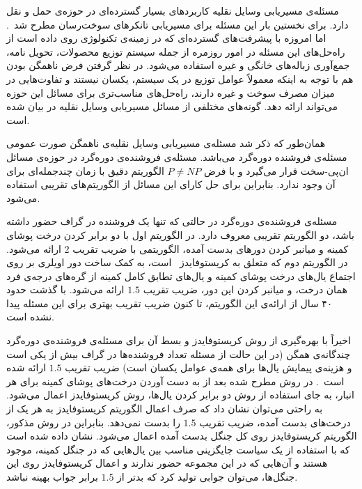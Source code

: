 
مسئله‌ی مسیریابی وسایل نقلیه کاربردهای بسیار گسترده‌ای در حوزه‌ی حمل و نقل دارد. برای نخستین بار این مسئله برای مسیریابی تانکرهای سوخت‌رسان مطرح شد~\cite{Dantzig}. اما امروزه با پیشرفت‌های گسترده‌ای که در زمینه‌ی تکنولوژی روی داده است از راه‌حل‌های این مسئله در امور روزمره از جمله سیستم توزیع محصولات، تحویل نامه، جمع‌آوری زباله‌های خانگی و غیره استفاده می‌شود. در نظر گرفتن فرض ناهمگن بودن هم با توجه به اینکه معمولاً عوامل توزیع در یک سیستم، یکسان نیستند و تفاوت‌هایی در میزان مصرف سوخت و غیره دارند، راه‌حل‌های مناسب‌تری برای مسائل این حوزه می‌تواند ارائه دهد.
گونه‌های مختلفی از مسائل مسیریابی وسایل نقلیه در 
بیان شده است.



همان‌طور که ذکر شد مسئله‌ی مسیریابی وسایل نقلیه‌ی ناهمگن صورت عمومی مسئله‌ی فروشنده دوره‌گرد می‌باشد. 
مسئله‌ی فروشنده‌ی دوره‌گرد در حوزه‌ی مسائل ان‌پی-سخت قرار می‌گیرد و با فرض $P \neq NP$ الگوریتم دقیق با زمان چندجمله‌ای برای آن وجود ندارد. بنابراین برای حل کارای این مسائل از الگوریتم‌های تقریبی  استفاده می‌شود.

مسئله‌ی فروشنده‌ی دوره‌گرد در حالتی که تنها یک فروشنده در گراف حضور داشته باشد، دو الگوریتم تقریبی معروف دارد.
در الگوریتم اول با دو برابر کردن درخت پوشای کمینه و میانبر کردن دورهای بدست آمده، الگوریتمی با ضریب تقریب 2 ارائه می‌شود.
در الگوریتم دوم که متعلق به کریستوفایدز~\cite{Christofides} است، به کمک ساخت دور اویلری بر روی اجتماع یال‌های درخت پوشای کمینه و یال‌های تطابق کامل کمینه از گره‌های درجه‌ی فرد همان درخت، و میانبر کردن این دور، ضریب تقریب $1.5$  ارائه می‌شود.
با گذشت حدود ۴۰ سال از ارائه‌ی این الگوریتم، تا کنون 
ضریب تقریب بهتری برای این مسئله پیدا نشده است.

اخیراً با بهره‌گیری از روش کریستوفایدز و بسط آن برای مسئله‌ی فروشنده‌ی دوره‌گرد چندگانه‌ی همگن (در این حالت از مسئله تعداد فروشنده‌ها در گراف بیش از یکی است و هزینه‌ی پیمایش یال‌ها برای همه‌ی عوامل یکسان است) ضریب تقریب $1.5$ ارائه شده است~\cite{Xu}. در روش مطرح شده بعد از به دست آوردن درخت‌های پوشای کمینه برای هر انبار، به جای استفاده از روش دو برابر کردن یال‌ها، روش کریستوفایدز اعمال می‌شود. به راحتی می‌توان نشان داد که صرف اعمال الگوریتم کریستوفایدز به هر یک از درخت‌های بدست آمده، ضریب تقریب  $1.5$ را بدست نمی‌دهد. بنابراین در روش مذکور، الگوریتم کریستوفایدز روی کل جنگل بدست آمده اعمال می‌شود. نشان داده شده است که با استفاده از یک سیاست جایگزینی مناسب بین یال‌هایی که در جنگل کمینه، موجود هستند و آن‌هایی که در این مجموعه حضور ندارند و اعمال کریستوفایدز روی این جنگل‌ها، می‌توان جوابی تولید کرد که بدتر از $1.5$ برابر جواب بهینه نباشد.


